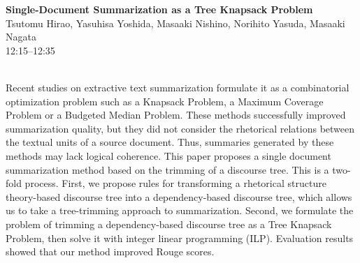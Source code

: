 \documentclass[twoside,makeidx]{book}
\begin{document}
\par\vspace{2em}\noindent%
\begin{minipage}{\linewidth}%
\begin{center}
\textbf{\normalsize Single-Document Summarization as a Tree Knapsack Problem}\\
\normalsize  Tsutomu Hirao,  Yasuhisa Yoshida,  Masaaki Nishino,  Norihito Yasuda,  Masaaki Nagata\\
{\small 12:15--12:35}\\
\end{center}
\end{minipage}\\[0.5em]
\nopagebreak%
\noindent%
{\small Recent studies on extractive text summarization formulate it as a  combinatorial optimization problem such as a Knapsack Problem, a Maximum  Coverage Problem or a Budgeted Median Problem. These methods successfully improved summarization quality, but they did not consider the rhetorical relations  between the textual units of a source document. Thus, summaries generated by these methods may lack logical coherence. This paper proposes a single document summarization method based on the trimming of a discourse tree.  This is a two-fold process. First, we propose rules for transforming a rhetorical structure theory-based discourse tree into a dependency-based discourse tree, which allows us to take a tree-trimming approach to summarization. Second, we formulate the problem of trimming a dependency-based discourse tree as a Tree Knapsack Problem, then solve it with integer linear programming (ILP). Evaluation results showed that our method improved Rouge scores.}
\clearpage
\end{document}
